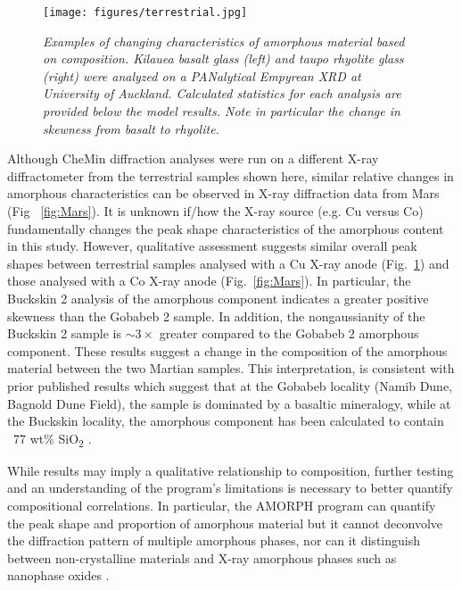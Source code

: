 \documentclass[review]{elsarticle}
\newcommand{\changed}{\color{blue}}
\begin{document}
\begin{figure}[!ht]
\centering
\texttt{[image: figures/terrestrial.jpg]}
\caption{\it \changed Examples of changing characteristics of amorphous material based on composition. Kilauea basalt glass (left) and taupo rhyolite glass (right) were analyzed on a PANalytical Empyrean XRD at University of Auckland. Calculated statistics for each analysis are provided below the model results. Note in particular the change in skewness from basalt to rhyolite.\label{fig:terrestrial}}
\end{figure}

Although CheMin
diffraction analyses were run on a different X-ray diffractometer from the terrestrial
samples shown here, similar relative changes in amorphous characteristics can be observed
in X-ray diffraction data from Mars {\changed (Fig ~\ref{fig:Mars}). It is unknown if/how the X-ray source (e.g. Cu versus Co) fundamentally changes the peak shape characteristics of the amorphous content in this study. However, qualitative assessment suggests similar overall peak shapes between terrestrial samples analysed with a Cu X-ray anode (Fig.~\ref{fig:terrestrial}) and those analysed with a Co X-ray anode (Fig.~\ref{fig:Mars})}. In particular, the Buckskin 2 analysis of the amorphous component indicates a greater positive skewness {\changed than the Gobabeb 2 sample. In addition, the nongaussianity of the Buckskin 2 sample is $\sim 3\times$ greater compared to the Gobabeb 2 amorphous component}. These results suggest a change in the
composition of the amorphous material {\changed between the two Martian samples}. This interpretation, is consistent with prior
published results which suggest that at the Gobabeb locality (Namib Dune, Bagnold Dune Field),
the sample is dominated by a basaltic mineralogy, while at the Buckskin locality,
the amorphous component has been calculated to contain ~77 wt\% SiO\textsubscript{2}
\citep[i.e. rhyolitic;][]{morris2016, achilles2017}. 


{\changed While results may imply a qualitative relationship to composition, further testing and an understanding of the program's limitations is necessary to better quantify compositional correlations. In particular, the AMORPH program can quantify the peak shape and proportion of amorphous material but it cannot deconvolve the diffraction pattern of multiple amorphous phases, nor can it distinguish between non-crystalline materials and X-ray amorphous phases such as nanophase oxides \citep{blake2013}.} 
\end{document}
